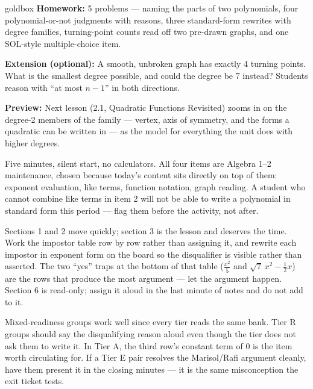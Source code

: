 \documentclass[10pt]{article}
\begin{document}
\begin{skillbox}{goldbox}
\textbf{Homework:} 5 problems --- naming the parts of two polynomials, four
polynomial-or-not judgments with reasons, three standard-form rewrites with degree
families, turning-point counts read off two pre-drawn graphs, and one SOL-style
multiple-choice item.

\textbf{Extension (optional):} A smooth, unbroken graph has exactly 4 turning
points. What is the smallest degree possible, and could the degree be 7 instead?
Students reason with ``at most $n-1$'' in both directions.

\textbf{Preview:} Next lesson (2.1, Quadratic Functions Revisited) zooms in on the
degree-2 members of the family --- vertex, axis of symmetry, and the forms a
quadratic can be written in --- as the model for everything the unit does with
higher degrees.
\end{skillbox}

\begin{teachernote}[Warm-Up]
Five minutes, silent start, no calculators. All four items are Algebra 1--2
maintenance, chosen because today's content sits directly on top of them: exponent
evaluation, like terms, function notation, graph reading. A student who cannot
combine like terms in item 2 will not be able to write a polynomial in standard
form this period --- flag them before the activity, not after.
\end{teachernote}

\begin{teachernote}
Sections 1 and 2 move quickly; section 3 is the lesson and deserves the time. Work
the impostor table row by row rather than assigning it, and rewrite each impostor
in exponent form on the board so the disqualifier is visible rather than asserted.
The two ``yes'' traps at the bottom of that table ($\frac{x^2}{5}$ and
$\sqrt{7}\,x^2 - \frac{1}{2}x$) are the rows that produce the most argument --- let
the argument happen. Section 6 is read-only; assign it aloud in the last minute of
notes and do not add to it.
\end{teachernote}

\begin{teachernote}
Mixed-readiness groups work well since every tier reads the same bank. Tier R
groups should say the disqualifying reason aloud even though the tier does not ask
them to write it. In Tier A, the third row's constant term of $0$ is the item worth
circulating for. If a Tier E pair resolves the Marisol/Rafi argument cleanly, have
them present it in the closing minutes --- it is the same misconception the exit
ticket tests.
\end{teachernote}
\end{document}
